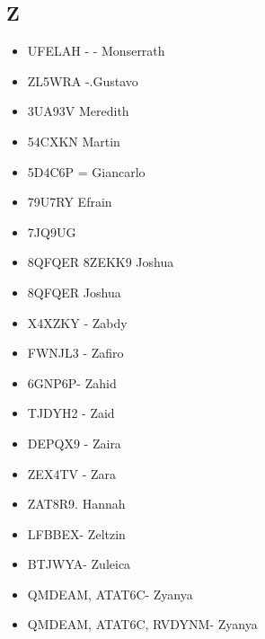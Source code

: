 \subsection*{Z}
\begin{itemize}[leftmargin=*,nosep]
\item UFELAH - - Monserrath
\item ZL5WRA -.Gustavo
\item 3UA93V Meredith
\item 54CXKN Martin
\item 5D4C6P = Giancarlo
\item 79U7RY Efrain
\item 7JQ9UG
\item 8QFQER 8ZEKK9 Joshua
\item 8QFQER Joshua
\item X4XZKY - Zabdy
\item FWNJL3 - Zafiro
\item 6GNP6P- Zahid
\item TJDYH2 - Zaid
\item DEPQX9 - Zaira
\item ZEX4TV - Zara
\item ZAT8R9. Hannah
\item LFBBEX- Zeltzin
\item BTJWYA- Zuleica
\item QMDEAM, ATAT6C- Zyanya
\item QMDEAM, ATAT6C, RVDYNM- Zyanya
\end{itemize}
